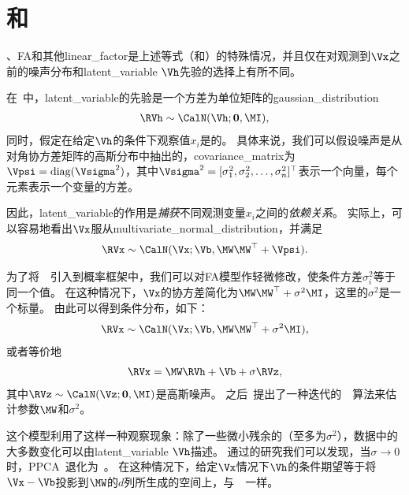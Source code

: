 \section{和}
\label{sec:probabilistic_PCA_and_factor_analysis}

、\gls{FA}和其他\gls{linear_factor}是上述等式（和）的特殊情况，并且仅在对观测到$\Vx$之前的噪声分布和\gls{latent_variable} $\Vh$先验的选择上有所不同。

在~\citep{Bartholomew-1987,Basilevsky94}中，\gls{latent_variable}的先验是一个方差为单位矩阵的\gls{gaussian_distribution}
\begin{align}
\label{eqn:133}
\RVh \sim \CalN(\Vh; \mathbf{0},\MI),
\end{align}
同时，假定在给定$\Vh$的条件下观察值$x_i$是的。
具体来说，我们可以假设噪声是从对角协方差矩阵的高斯分布中抽出的，\gls{covariance_matrix}为$\Vpsi = \text{diag}(\Vsigma^2)$，其中$\Vsigma^2 = [\sigma_1^2,\sigma_2^2,\ldots,\sigma_n^2]^{\top}$表示一个向量，每个元素表示一个变量的方差。


因此，\gls{latent_variable}的作用是\emph{捕获}不同观测变量$x_i$之间的\emph{依赖关系}。
实际上，可以容易地看出$\Vx$服从\gls{multivariate_normal_distribution}，并满足
\begin{align}
\label{eqn:134}
\RVx \sim \CalN(\Vx; \Vb, \MW\MW^{\top}+\Vpsi).
\end{align}



为了将~~引入到概率框架中，我们可以对\gls{FA}模型作轻微修改，使条件方差$\sigma_i^2$等于同一个值。
在这种情况下，$\Vx$的协方差简化为$\MW\MW^{\top}+\sigma^2\MI$，这里的$\sigma^2$是一个标量。
由此可以得到条件分布，如下：
\begin{align}
\label{eqn:135}
\RVx \sim \CalN(\Vx; \Vb, \MW\MW^{\top} + \sigma^2\MI ),
\end{align}
或者等价地
\begin{align}
\label{eqn:136}
\RVx = \MW\RVh + \Vb + \sigma\RVz,
\end{align}
其中$\RVz \sim \CalN(\Vz;\mathbf{0},\MI)$是高斯噪声。
之后~\citet{tipping99mixtures}提出了一种迭代的~~算法来估计参数$\MW$和$\sigma^2$。


这个模型利用了这样一种观察现象：除了一些微小残余的（至多为$\sigma^2$），数据中的大多数变化可以由\gls{latent_variable} $\Vh$描述。
通过\citet{tipping99mixtures}的研究我们可以发现，当$\sigma \xrightarrow{} 0$时，\gls{PPCA}~退化为~。
在这种情况下，给定$\Vx$情况下$\Vh$的条件期望等于将$\Vx - \Vb$投影到$\MW$的$d$列所生成的空间上，与~~一样。


